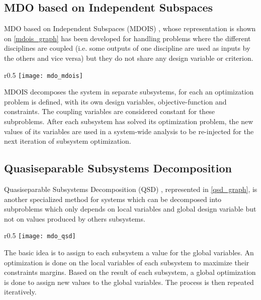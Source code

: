 \subsection{MDO based on Independent Subspaces}

MDO based on Independent Subspaces (MDOIS) \cite{NME:NME1380}, whose representation is shown on \figurename{} \ref{mdois_graph} has been developed for handling problems where the different disciplines are coupled (i.e. some outputs of one discipline are used as inputs by the others and vice versa) but they do not share any design variable or criterion.

\begin{wrapfigure}{r}{0.5\textwidth}
\centering
\texttt{[image: mdo\_mdois]}
\caption{MDOIS method}\label{mdois_graph}
\end{wrapfigure}

MDOIS decomposes the system in separate subsystems, for each an optimization problem is defined, with its own design variables, objective-function and constraints. The coupling variables are considered constant for these subproblems. After each subsystem has solved its optimization problem, the new values of its variables are used in a system-wide analysis to be re-injected for the next iteration of subsystem optimization.

\subsection{Quasiseparable Subsystems Decomposition}

Quasiseparable Subsystems Decomposition (QSD) \cite{1389-4420}, represented in \figurename{} \ref{qsd_graph}, is another specialized method for systems which can be decomposed into subproblems which only depends on local variables and global design variable but not on values produced by others subsystems.

\begin{wrapfigure}{r}{0.5\textwidth}
\centering
\texttt{[image: mdo\_qsd]}
\caption{QSD method}\label{qsd_graph}
\end{wrapfigure}

The basic idea is to assign to each subsystem a value for the global variables. An optimization is done on the local variables of each subsystem to maximize their constraints margins. Based on the result of each subsystem, a global optimization is done to assign new values to the global variables. The process is then repeated iteratively.

